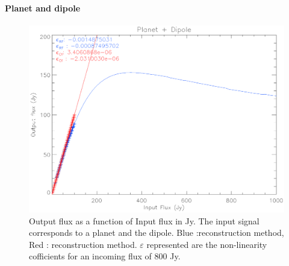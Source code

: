 \paragraph{Planet and dipole}

\begin{figure}[h]
\center
	\includegraphics[scale=0.55]{Figures/nl-planet-dipole.eps}
	\caption{Output flux as a function of Input flux in Jy. The input signal corresponds to a planet and the dipole. Blue :\rf reconstruction method, Red : \cf reconstruction method. $\varepsilon$  represented are the non-linearity cofficients for an incoming flux of 800 Jy.}
	\label{fig:nl-planet-dipole}
\end{figure}

